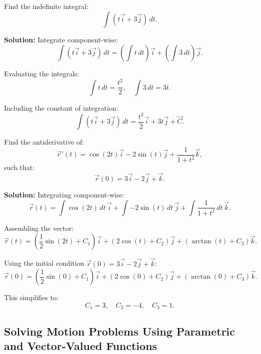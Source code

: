 \documentclass[12pt]{article}
\theoremstyle{beautifulthm}
\begin{document}
\begin{tcolorbox}[colback=examplebg, colframe=red!75!black, title=\textbf{EXAMPLE 2: Integrating a Vector-Valued Function}, fonttitle=\bfseries, sharp corners]

Find the indefinite integral:
\[
\int \left( t \vec{i} + 3 \vec{j} \right) \, dt.
\]

\tcblower
\textbf{Solution:} 
Integrate component-wise:
\[
\int \left( t \vec{i} + 3 \vec{j} \right) \, dt = \left( \int t \, dt \right) \vec{i} + \left( \int 3 \, dt \right) \vec{j}.
\]

Evaluating the integrals:
\[
\int t \, dt = \frac{t^2}{2}, \quad \int 3 \, dt = 3t.
\]

Including the constant of integration:
\[
\int \left( t \vec{i} + 3 \vec{j} \right) \, dt = \frac{t^2}{2} \vec{i} + 3t \vec{j} + \vec{C}.
\]

\end{tcolorbox}


\begin{tcolorbox}[colback=examplebg, colframe=red!75!black, title=\textbf{EXAMPLE 3: The Antiderivative of a Vector-Valued Function}, fonttitle=\bfseries, sharp corners]

Find the antiderivative of:
\[
\vec{r}'(t) = \cos(2t) \vec{i} - 2\sin(t) \vec{j} + \frac{1}{1+t^2} \vec{k},
\]
such that:
\[
\vec{r}(0) = 3 \vec{i} - 2 \vec{j} + \vec{k}.
\]

\tcblower
\textbf{Solution:} 
Integrating component-wise:
\[
\vec{r}(t) = \int \cos(2t) \, dt \, \vec{i} + \int -2\sin(t) \, dt \, \vec{j} + \int \frac{1}{1+t^2} \, dt \, \vec{k}.
\]



Assembling the vector:
\[
\vec{r}(t) = \left( \frac{1}{2}\sin(2t) + C_1 \right) \vec{i} + \left( 2\cos(t) + C_2 \right) \vec{j} + \left( \arctan(t) + C_3 \right) \vec{k}.
\]

Using the initial condition $\vec{r}(0) = 3 \vec{i} - 2 \vec{j} + \vec{k}$:
\[
\vec{r}(0) = \left( \frac{1}{2}\sin(0) + C_1 \right) \vec{i} + \left( 2\cos(0) + C_2 \right) \vec{j} + \left( \arctan(0) + C_3 \right) \vec{k}.
\]

This simplifies to:
\[
C_1 = 3, \quad C_2 = -4, \quad C_3 = 1.
\]
\end{tcolorbox}

\subsection{Solving Motion Problems
Using Parametric and
Vector-Valued Functions}
\end{document}
